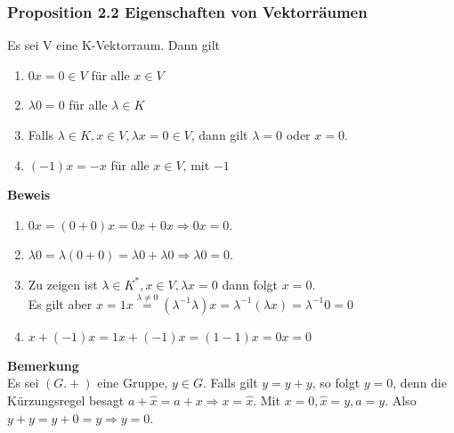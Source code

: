 \documentclass{scrartcl}
\newcommand{\lb}{\lambda}
\begin{document}
\subsubsection{Proposition 2.2 Eigenschaften von Vektorr\"aumen}
Es sei V eine K-Vektorraum. Dann gilt
\begin{enumerate}
\item{\(0 x = 0 \in V\) f\"ur alle \(x \in V\)}
\item{\(\lb 0 = 0\) f\"ur alle \(\lb \in K\)}
\item{Falls \(\lb \in K, x \in V, \lb x = 0 \in V\), dann gilt \(\lb = 0\) oder \(x = 0\).}
\item{\((-1) x = -x\) f\"ur alle \(x \in V\), mit \(-1 \)}
\end{enumerate}
\textbf{Beweis}
\begin{enumerate}
\item{\(0 x = (0 + 0)x = 0x + 0x \Rightarrow 0x = 0\).}
\item{\(\lb 0 = \lb(0 + 0) = \lb 0 + \lb 0 \Rightarrow \lb 0 = 0\).}
\item{Zu zeigen ist \(\lb \in K^*, x \in V, \lb x = 0\) dann folgt \(x = 0\).\\
Es gilt aber \(x = 1 x \overset{\lb \neq 0}{=} (\lb ^{-1} \lb) x = \lb^{-1}(\lb x) = \lb^{-1} 0 = 0\)}
\item{\(x + (-1) x = 1x + (-1) x = (1 - 1)  x = 0 x = 0\)}
\end{enumerate}
\textbf{Bemerkung}\\
Es sei \((G. +)\) eine Gruppe, \(y \in G\). Falls gilt \(y = y + y\), so folgt \(y = 0\), denn die K\"urzungsregel besagt \(a + \hat{x} = a+x \Rightarrow x = \hat{x}\). Mit \(x = 0, \hat{x} = y, a = y\). Also \(y +y = y + 0 = y \Rightarrow y = 0\).
\end{document}
